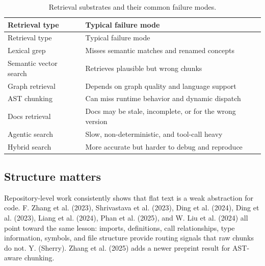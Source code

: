 \documentclass[
  11pt,
  letterpaper,
  numbers=noendperiod,
  parskip=half]{scrartcl}
\begin{document}
\figureRetrievalLandscape

\begin{longtable}[]{@{}
  >{\raggedright\arraybackslash}p{}
  >{\raggedright\arraybackslash}p{}@{}}
\caption{Retrieval substrates and their common failure
modes.}\label{tbl-retrieval-types}\tabularnewline
\toprule\noalign{}
\begin{minipage}[b]{\linewidth}\raggedright
Retrieval type
\end{minipage} & \begin{minipage}[b]{\linewidth}\raggedright
Typical failure mode
\end{minipage} \\
\midrule\noalign{}
\endfirsthead
\toprule\noalign{}
\begin{minipage}[b]{\linewidth}\raggedright
Retrieval type
\end{minipage} & \begin{minipage}[b]{\linewidth}\raggedright
Typical failure mode
\end{minipage} \\
\midrule\noalign{}
\endhead
\bottomrule\noalign{}
\endlastfoot
Lexical grep & Misses semantic matches and renamed concepts \\
Semantic vector search & Retrieves plausible but wrong chunks \\
Graph retrieval & Depends on graph quality and language support \\
AST chunking & Can miss runtime behavior and dynamic dispatch \\
Docs retrieval & Docs may be stale, incomplete, or for the wrong
version \\
Agentic search & Slow, non-deterministic, and tool-call heavy \\
Hybrid search & More accurate but harder to debug and reproduce \\
\end{longtable}

\subsection{Structure matters}\label{sec-structure}

Repository-level work consistently shows that flat text is a weak
abstraction for code. F. Zhang et al. (2023), Shrivastava et al. (2023),
Ding et al. (2024), {Ding et al.} (2023), {Liang et al.} (2024), {Phan
et al.} (2025), and {W. Liu et al.} (2024) all point toward the same
lesson: imports, definitions, call relationships, type information,
symbols, and file structure provide routing signals that raw chunks do
not. {Y. (Sherry). Zhang et al.} (2025) adds a newer preprint result for
AST-aware chunking.
\end{document}
